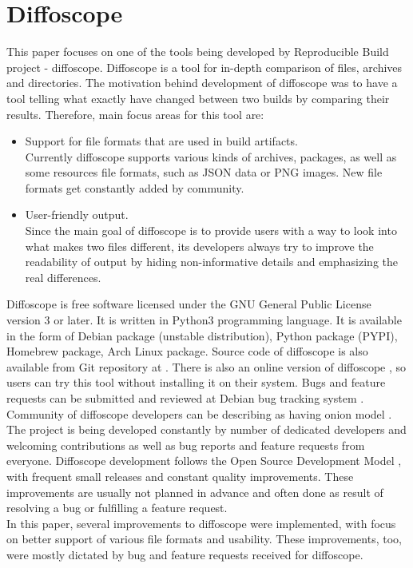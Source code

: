 \section{Diffoscope}

This paper focuses on one of the tools being developed by
Reproducible Build project - diffoscope.
Diffoscope is a tool for in-depth comparison of files, archives and
directories\cite{dfs}.
The motivation behind development of diffoscope was to have a tool
telling what exactly have changed between two builds by comparing
their results. Therefore, main focus areas for this tool are:
\begin{itemize}
    \item Support for file formats that are used in build artifacts. \\
    Currently diffoscope supports various kinds of archives, packages,
    as well as some resources file formats, such as JSON data or PNG images.
    New file formats get constantly added by community.
    \item User-friendly output.\\
    Since the main goal of diffoscope is to provide users with a way to look
    into what makes two files different, its developers always try to
    improve the readability of output by hiding non-informative details and
    emphasizing the real differences.
\end{itemize}

Diffoscope is free software licensed under the GNU General Public
License version 3 or later. It is written in Python3 programming language.
It is available in the form of Debian package (unstable distribution),
Python package (PYPI), Homebrew package, Arch Linux package. Source code
of diffoscope is also available from Git repository at \cite{dfs-git}.
There is also an online version of diffoscope \cite{try-dfs}, so users
can try this tool without installing it on their system.
Bugs and feature requests can be submitted and reviewed at Debian
bug tracking system \cite{dfs-bugs}.\\
Community of diffoscope developers can be describing as having
onion model \cite{aberdour2007achieving}.
The project is being developed constantly by number of dedicated
developers and welcoming contributions as well as bug reports
and feature requests from everyone.
Diffoscope development follows the Open Source Development Model
\cite{osdm}, with frequent small releases and constant quality improvements.
These improvements are usually not planned in advance and often
done as result of resolving a bug or fulfilling a feature request.\\
In this paper, several improvements to diffoscope were implemented,
with focus on better support of various file formats and usability.
These improvements, too, were mostly dictated by bug and feature requests
received for diffoscope.



